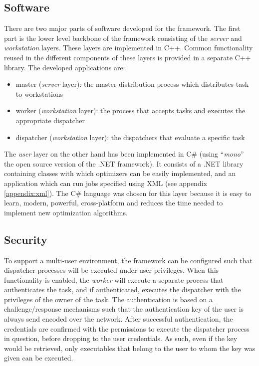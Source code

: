 \documentclass{article}
\begin{document}
\subsection{Software}
There are two major parts of software developed for the framework. The first
part is the lower level backbone of the framework consisting of the 
\textit{server} and \textit{workstation} layers. These layers are implemented in
C++. Common functionality reused in the different components of these layers
is provided in a separate C++ library. The developed applications are:

\begin{itemize}
	\item master (\textit{server} layer): the master distribution process which
	distributes task to workstations
	\item worker (\textit{workstation} layer): the process that accepts tasks
	and executes the appropriate dispatcher
	\item dispatcher (\textit{workstation} layer): the dispatchers that 
	evaluate a specific task
\end{itemize}

The \textit{user} layer on the other hand has been implemented in C\# (using
``\textit{mono}'' the open source version of the .NET framework). It consists of a
.NET library containing classes with which optimizers can be easily implemented,
and an application which can run jobs specified using XML (see appendix
\ref{appendix:xml}). The C\# language
was chosen for this layer because it is easy to learn, modern, powerful,
cross-platform and reduces the time needed to implement new optimization
algorithms.

\subsection{Security}
To support a multi-user environment, the framework can be configured such that
dispatcher processes will be executed under user privileges. When this
functionality is enabled, the \textit{worker} will execute a separate process
that authenticates the task, and if authenticated, executes the dispatcher with
the privileges of the owner of the task. The authentication is based on
a challenge/response mechanisms such that the authentication key of the user
is always send encoded over the network. After successful authentication, the
credentials are confirmed with the permissions to execute the dispatcher
process in question, before dropping to the user credentials. As such, even
if the key would be retrieved, only executables that belong to the user
to whom the key was given can be executed.
\end{document}
